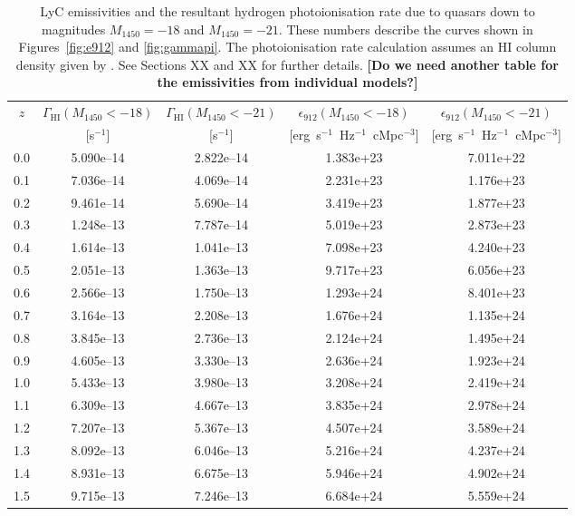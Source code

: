 \documentclass[a4paper,fleqn,usenatbib]{mnras}
\newcommand{\gk}[1]{{\bf \color{notecolor} [#1]}}
\begin{document}
\begin{table*}
  \caption{LyC emissivities and the resultant hydrogen photoionisation
    rate due to quasars down to magnitudes $M_{1450}=-18$ and
    $M_{1450}=-21$.  These numbers describe the curves shown in
    Figures~\ref{fig:e912} and \ref{fig:gammapi}.  The photoionisation
    rate calculation assumes an HI column density given by
    \citet{2012ApJ...746..125H}.  See Sections XX and XX for further
    details.  \gk{Do we need another table for the emissivities from
      individual models?}}
  \label{tab:gamma}
  \begin{tabular}{ccccc}
    \hline
    $z$ & $\Gamma_\mathrm{HI} (M_{1450}<-18)$ & $\Gamma_\mathrm{HI} (M_{1450}<-21)$ & $\epsilon_{912} (M_{1450}<-18)$ & $\epsilon_{912} (M_{1450}<-21)$ \\
    & [s$^{-1}$] & [s$^{-1}$] & [erg\ s$^{-1}$\ Hz$^{-1}$\ cMpc$^{-3}$] & [erg\ s$^{-1}$\ Hz$^{-1}$\ cMpc$^{-3}$] \\ 
    \hline
    0.0 & 5.090e--14 & 2.822e--14 & 1.383e+23 & 7.011e+22 \\
    0.1 & 7.036e--14 & 4.069e--14 & 2.231e+23 & 1.176e+23 \\
    0.2 & 9.461e--14 & 5.690e--14 & 3.419e+23 & 1.877e+23 \\
    0.3 & 1.248e--13 & 7.787e--14 & 5.019e+23 & 2.873e+23 \\
    0.4 & 1.614e--13 & 1.041e--13 & 7.098e+23 & 4.240e+23 \\
    0.5 & 2.051e--13 & 1.363e--13 & 9.717e+23 & 6.056e+23 \\
    0.6 & 2.566e--13 & 1.750e--13 & 1.293e+24 & 8.401e+23 \\
    0.7 & 3.164e--13 & 2.208e--13 & 1.676e+24 & 1.135e+24 \\
    0.8 & 3.845e--13 & 2.736e--13 & 2.124e+24 & 1.495e+24 \\
    0.9 & 4.605e--13 & 3.330e--13 & 2.636e+24 & 1.923e+24 \\
    1.0 & 5.433e--13 & 3.980e--13 & 3.208e+24 & 2.419e+24 \\
    1.1 & 6.309e--13 & 4.667e--13 & 3.835e+24 & 2.978e+24 \\
    1.2 & 7.207e--13 & 5.367e--13 & 4.507e+24 & 3.589e+24 \\
    1.3 & 8.092e--13 & 6.046e--13 & 5.216e+24 & 4.237e+24 \\
    1.4 & 8.931e--13 & 6.675e--13 & 5.946e+24 & 4.902e+24 \\
    1.5 & 9.715e--13 & 7.246e--13 & 6.684e+24 & 5.559e+24 \\

\end{tabular}
\end{table*}
\end{document}
